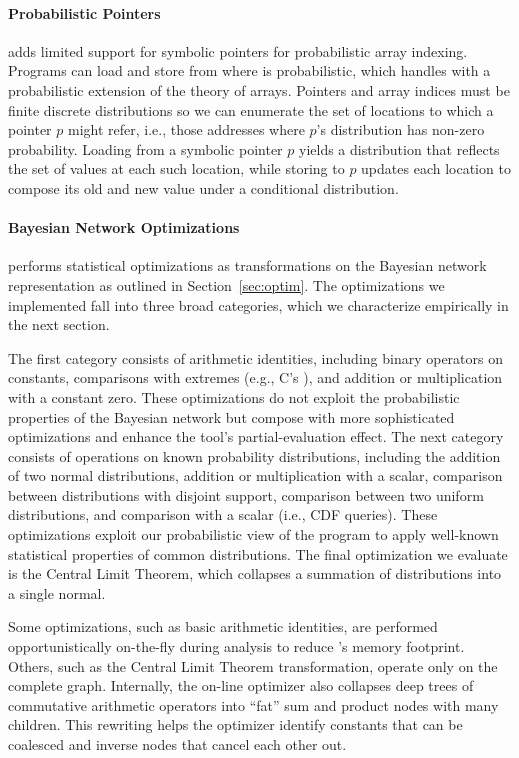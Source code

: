 \paragraph{Probabilistic Pointers}

\tool adds limited support for symbolic pointers for probabilistic array
indexing. Programs can load and store from  where  is
probabilistic, which \tool handles with a probabilistic extension of the
theory of
arrays. Pointers and array indices must be finite discrete
distributions so we can enumerate the set of locations to which a pointer $p$
might refer, i.e., those addresses where $p$'s distribution has non-zero
probability.
Loading from a symbolic pointer $p$ yields a distribution that
reflects the set of values at each such location, while storing to
$p$ updates each location to compose its old and new value
under a conditional distribution.

\paragraph{Bayesian Network Optimizations}

\tool performs statistical optimizations as transformations on the Bayesian
network representation as outlined in Section~\ref{sec:optim}. The
optimizations we implemented fall into three broad categories,
which we characterize empirically in the next section.

The first category consists of arithmetic identities, including
binary operators on constants, comparisons with extremes (e.g.,
C's ), and addition or multiplication with a constant zero.
These optimizations do not exploit the probabilistic properties of the
Bayesian network but compose with more sophisticated optimizations and enhance
the tool's partial-evaluation effect.
The next category consists of operations on known probability distributions,
including the addition of two normal distributions, addition or
multiplication with a scalar, comparison between distributions with disjoint
support, comparison between two uniform distributions, and comparison with a
scalar (i.e., CDF queries).
These optimizations exploit our probabilistic view of the program to apply
well-known statistical properties of common distributions.
The final optimization we evaluate is the Central Limit Theorem, which
collapses a summation of distributions into a single normal.

Some optimizations, such as basic arithmetic identities, are performed
opportunistically on-the-fly during analysis to reduce \tool's memory
footprint.
Others, such as the Central Limit Theorem transformation, operate only on the
complete graph.
Internally, the on-line optimizer also collapses deep trees of commutative
arithmetic operators into ``fat'' sum and product nodes with many children.
This rewriting helps the optimizer identify constants that can be coalesced and
inverse nodes that cancel each other out.



